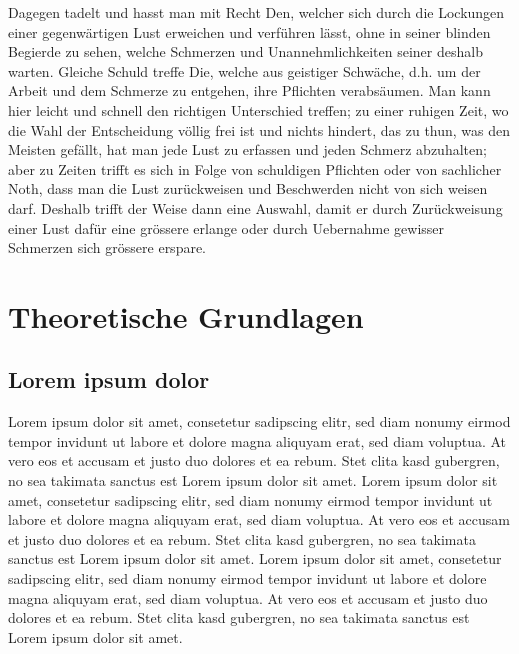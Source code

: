 \documentclass[ %
	DIV=15,
	BCOR=14mm, %
	parskip=half, %
	headsepline, %
	cleardoublepage=empty, %
	tablecaptionabove, %
	toc=bib, %
	toc=listofnumbered, %
	listof=leveldown, %
	numbers=noendperiod %
	]{scrbook}
\begin{document}
Dagegen tadelt und hasst man mit Recht Den, welcher sich durch die Lockungen einer gegenwärtigen Lust erweichen und verführen lässt, ohne in seiner blinden Begierde zu sehen, welche Schmerzen und Unannehmlichkeiten seiner deshalb warten. Gleiche Schuld treffe Die, welche aus geistiger Schwäche, d.h. um der Arbeit und dem Schmerze zu entgehen, ihre Pflichten verabsäumen. Man kann hier leicht und schnell den richtigen Unterschied treffen; zu einer ruhigen Zeit, wo die Wahl der Entscheidung völlig frei ist und nichts hindert, das zu thun, was den Meisten gefällt, hat man jede Lust zu erfassen und jeden Schmerz abzuhalten; aber zu Zeiten trifft es sich in Folge von schuldigen Pflichten oder von sachlicher Noth, dass man die Lust zurückweisen und Beschwerden nicht von sich weisen darf. Deshalb trifft der Weise dann eine Auswahl, damit er durch Zurückweisung einer Lust dafür eine grössere erlange oder durch Uebernahme gewisser Schmerzen sich grössere erspare.


\chapter{Theoretische Grundlagen} %
\label{cha:theoretische_grundlagen}

\section{Lorem ipsum dolor} %
\label{sec:lorem_ipsum_dolor}

Lorem ipsum dolor sit amet, consetetur sadipscing elitr, sed diam nonumy eirmod tempor invidunt ut labore et dolore magna aliquyam erat, sed diam voluptua. At vero eos et accusam et justo duo dolores et ea rebum. Stet clita kasd gubergren, no sea takimata sanctus est Lorem ipsum dolor sit amet. Lorem ipsum dolor sit amet, consetetur sadipscing elitr, sed diam nonumy eirmod tempor invidunt ut labore et dolore magna aliquyam erat, sed diam voluptua. At vero eos et accusam et justo duo dolores et ea rebum. Stet clita kasd gubergren, no sea takimata sanctus est Lorem ipsum dolor sit amet. Lorem ipsum dolor sit amet, consetetur sadipscing elitr, sed diam nonumy eirmod tempor invidunt ut labore et dolore magna aliquyam erat, sed diam voluptua. At vero eos et accusam et justo duo dolores et ea rebum. Stet clita kasd gubergren, no sea takimata sanctus est Lorem ipsum dolor sit amet.
\end{document}
